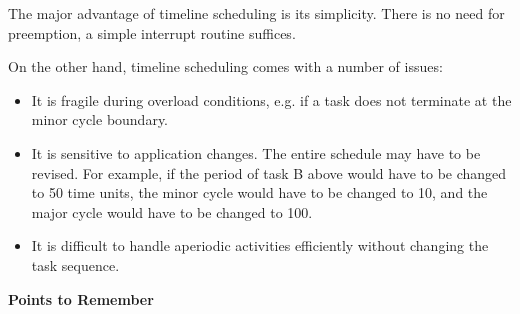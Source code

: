 The major advantage of timeline scheduling is its simplicity. There is
no need for preemption, a simple interrupt routine suffices.

On the other hand, timeline scheduling comes with a number of issues:

\begin{itemize}
\item
  It is fragile during overload conditions, e.g. if a task does not
  terminate at the minor cycle boundary.
\item
  It is sensitive to application changes. The entire schedule may have
  to be revised. For example, if the period of task B above would have
  to be changed to 50 time units, the minor cycle would have to be
  changed to 10, and the major cycle would have to be changed to 100.
\item
  It is difficult to handle aperiodic activities efficiently without
  changing the task sequence.
\end{itemize}

\protect\hypertarget{teil8}{}{}\textbf{Points to Remember}
